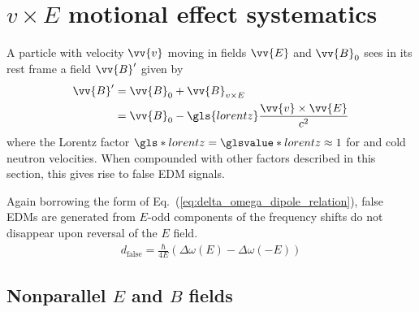 


\section
{
    \texorpdfstring{$v\times E$ motional effect systematics}
                    {v x E motional effect systematics}\label{sec:v_cross_E}
}


A particle with velocity $\vv{v}$ moving in fields $\vv{E}$ and $\vv{B}_0$ sees in its rest frame a field $\vv{B}'$ given by
%
\begin{align}
    \vv{B}' &= \vv{B}_0+\vv{B}_{v\times E} \\
            &= \vv{B}_0-\gls{lorentz}\frac{\vv{v}\times\vv{E}}{c^2}
\end{align}
%
where the Lorentz factor $\gls*{lorentz}=\glsvalue*{lorentz}\approx 1$ for \ucn and cold neutron velocities. When compounded with other factors described in this section, this gives rise to false EDM signals.

Again borrowing the form of Eq.~(\ref{eq:delta_omega_dipole_relation}), false EDMs are generated from $E$-odd components of the frequency shifts do not disappear upon reversal of the $E$ field.
%
\begin{gather}
    d_\text{false}=\frac{\hbar}{4E}(\Delta\omega(E)-\Delta\omega(-E))
\end{gather}

\subsection*{
    \texorpdfstring{Nonparallel $E$ and $B$ fields}
                    {Nonparallel E and B fields}
}

